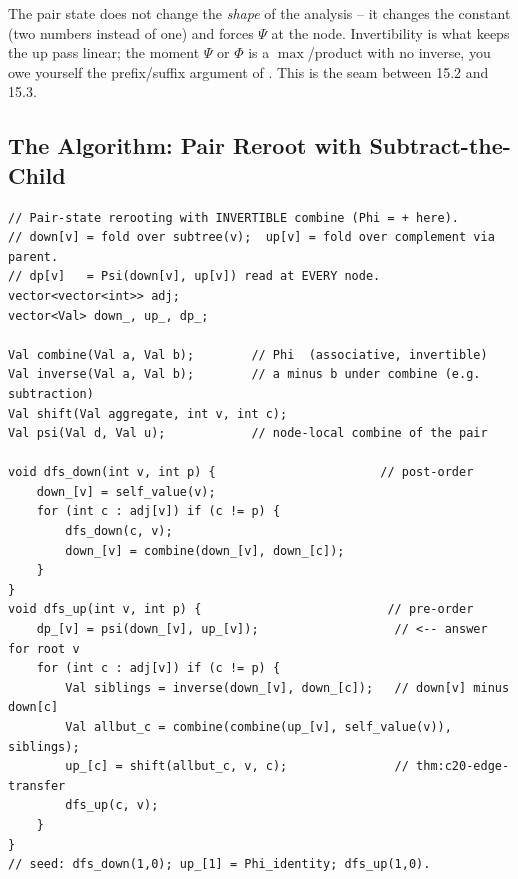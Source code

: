 \noindent The pair state does not change the \emph{shape} of the analysis --
it changes the constant (two numbers instead of one) and forces $\Psi$ at the
node. Invertibility is what keeps the up pass linear; the moment $\Psi$ or
$\Phi$ is a $\max$/product with no inverse, you owe yourself the prefix/suffix
argument of . This is the seam between 15.2 and 15.3.

\subsection{The Algorithm: Pair Reroot with Subtract-the-Child}

\begin{lstlisting}[caption={The pair-state two-DFS: both components transfer, siblings recovered by inverting Phi (no O(deg) loop).}, label={lst:c20-updown}]
// Pair-state rerooting with INVERTIBLE combine (Phi = + here).
// down[v] = fold over subtree(v);  up[v] = fold over complement via parent.
// dp[v]   = Psi(down[v], up[v]) read at EVERY node.
vector<vector<int>> adj;
vector<Val> down_, up_, dp_;

Val combine(Val a, Val b);        // Phi  (associative, invertible)
Val inverse(Val a, Val b);        // a minus b under combine (e.g. subtraction)
Val shift(Val aggregate, int v, int c);
Val psi(Val d, Val u);            // node-local combine of the pair

void dfs_down(int v, int p) {                       // post-order
    down_[v] = self_value(v);
    for (int c : adj[v]) if (c != p) {
        dfs_down(c, v);
        down_[v] = combine(down_[v], down_[c]);
    }
}
void dfs_up(int v, int p) {                          // pre-order
    dp_[v] = psi(down_[v], up_[v]);                   // <-- answer for root v
    for (int c : adj[v]) if (c != p) {
        Val siblings = inverse(down_[v], down_[c]);   // down[v] minus down[c]
        Val allbut_c = combine(combine(up_[v], self_value(v)), siblings);
        up_[c] = shift(allbut_c, v, c);               // thm:c20-edge-transfer
        dfs_up(c, v);
    }
}
// seed: dfs_down(1,0); up_[1] = Phi_identity; dfs_up(1,0).
\end{lstlisting}

